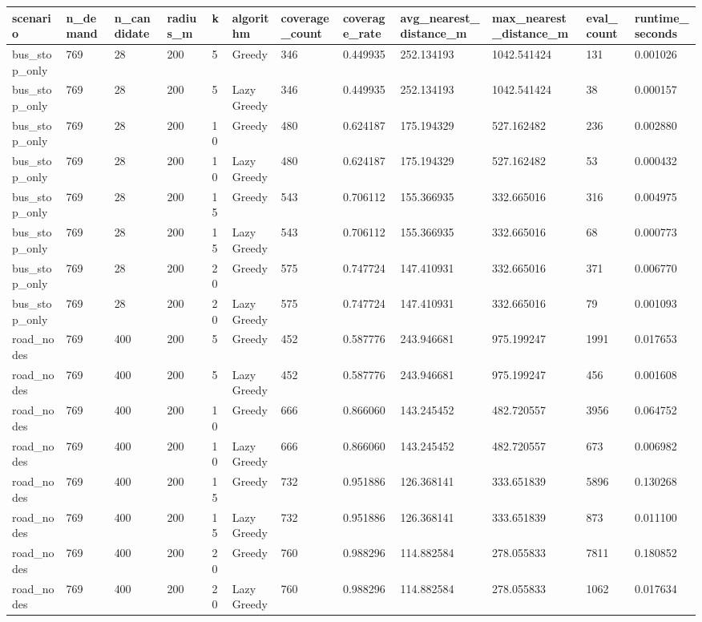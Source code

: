 \begin{tabular}{llllllllllll}
\hline
scenario & n_demand & n_candidate & radius_m & k & algorithm & coverage_count & coverage_rate & avg_nearest_distance_m & max_nearest_distance_m & eval_count & runtime_seconds \\
\hline
bus_stop_only & 769 & 28 & 200 & 5 & Greedy & 346 & 0.449935 & 252.134193 & 1042.541424 & 131 & 0.001026 \\
bus_stop_only & 769 & 28 & 200 & 5 & Lazy Greedy & 346 & 0.449935 & 252.134193 & 1042.541424 & 38 & 0.000157 \\
bus_stop_only & 769 & 28 & 200 & 10 & Greedy & 480 & 0.624187 & 175.194329 & 527.162482 & 236 & 0.002880 \\
bus_stop_only & 769 & 28 & 200 & 10 & Lazy Greedy & 480 & 0.624187 & 175.194329 & 527.162482 & 53 & 0.000432 \\
bus_stop_only & 769 & 28 & 200 & 15 & Greedy & 543 & 0.706112 & 155.366935 & 332.665016 & 316 & 0.004975 \\
bus_stop_only & 769 & 28 & 200 & 15 & Lazy Greedy & 543 & 0.706112 & 155.366935 & 332.665016 & 68 & 0.000773 \\
bus_stop_only & 769 & 28 & 200 & 20 & Greedy & 575 & 0.747724 & 147.410931 & 332.665016 & 371 & 0.006770 \\
bus_stop_only & 769 & 28 & 200 & 20 & Lazy Greedy & 575 & 0.747724 & 147.410931 & 332.665016 & 79 & 0.001093 \\
road_nodes & 769 & 400 & 200 & 5 & Greedy & 452 & 0.587776 & 243.946681 & 975.199247 & 1991 & 0.017653 \\
road_nodes & 769 & 400 & 200 & 5 & Lazy Greedy & 452 & 0.587776 & 243.946681 & 975.199247 & 456 & 0.001608 \\
road_nodes & 769 & 400 & 200 & 10 & Greedy & 666 & 0.866060 & 143.245452 & 482.720557 & 3956 & 0.064752 \\
road_nodes & 769 & 400 & 200 & 10 & Lazy Greedy & 666 & 0.866060 & 143.245452 & 482.720557 & 673 & 0.006982 \\
road_nodes & 769 & 400 & 200 & 15 & Greedy & 732 & 0.951886 & 126.368141 & 333.651839 & 5896 & 0.130268 \\
road_nodes & 769 & 400 & 200 & 15 & Lazy Greedy & 732 & 0.951886 & 126.368141 & 333.651839 & 873 & 0.011100 \\
road_nodes & 769 & 400 & 200 & 20 & Greedy & 760 & 0.988296 & 114.882584 & 278.055833 & 7811 & 0.180852 \\
road_nodes & 769 & 400 & 200 & 20 & Lazy Greedy & 760 & 0.988296 & 114.882584 & 278.055833 & 1062 & 0.017634 \\
\hline
\end{tabular}
